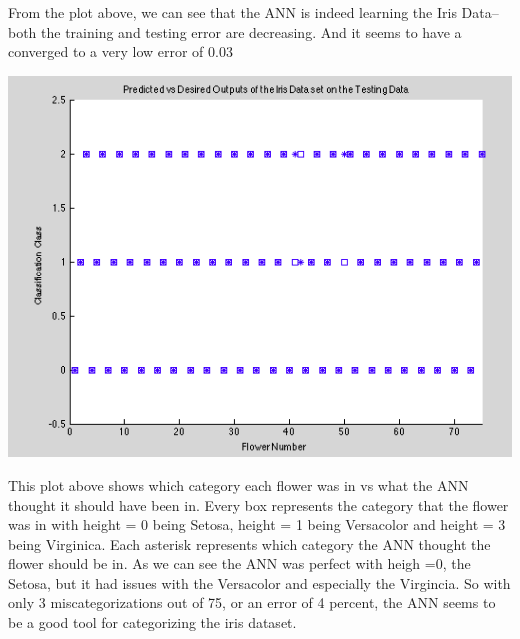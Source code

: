\documentclass[epsfig]{article}
\begin{document}
From the plot above, we can see that the ANN is indeed learning the Iris Data--both the training and testing error are decreasing. And it seems to have a converged to a very low error of 0.03
\begin{center}
\includegraphics[scale=0.7]{pic10.png}
\end{center}
This plot above shows which category each flower was in vs what the ANN thought it should have been in. Every box represents the category that the flower was in with height = 0 being Setosa, height = 1 being Versacolor and  height = 3 being Virginica.  Each asterisk represents which category the ANN thought the flower should be in. As we can see the ANN was perfect with heigh =0, the Setosa, but it had issues with the Versacolor and especially the Virgincia. So with only 3 miscategorizations out of 75, or an error of 4 percent, the ANN seems to be a good tool for categorizing the iris dataset.
\end{document}
